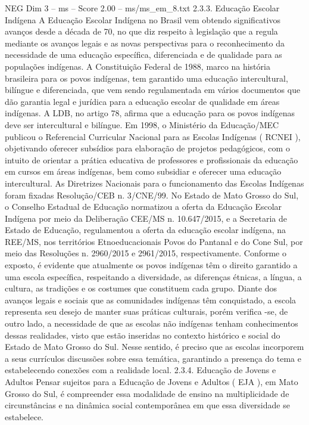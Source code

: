 \begin{textsample}{NEG Dim 3 – ms – Score 2.00 – ms/ms\_em\_8.txt}  \label{ex:f3_neg_099}
2.3.3.
Educação Escolar Indígena A Educação Escolar Indígena no Brasil vem obtendo significativos avanços desde a década de 70, no que diz respeito à legislação que a regula mediante os avanços legais e as novas perspectivas para o reconhecimento da necessidade de uma educação específica, diferenciada e de qualidade para as populações indígenas.
A Constituição Federal de 1988, marco na história brasileira para os povos indígenas, tem garantido uma educação intercultural, bilíngue e diferenciada, que vem sendo regulamentada em vários documentos que dão garantia legal e jurídica para a educação escolar de qualidade em áreas indígenas.
A LDB, no artigo 78, afirma que a educação para os povos indígenas deve ser intercultural e bilíngue.
Em 1998, o Ministério da Educação/MEC publicou o Referencial Curricular Nacional para as Escolas Indígenas ( RCNEI ), objetivando oferecer subsídios para elaboração de projetos pedagógicos, com o intuito de orientar a prática educativa de professores e profissionais da educação em cursos em áreas indígenas, bem como subsidiar e oferecer uma educação intercultural.
As Diretrizes Nacionais para o funcionamento das Escolas Indígenas foram fixadas Resolução/CEB n. 3/CNE/99.
No Estado de Mato Grosso do Sul, o Conselho Estadual de Educação normatizou a oferta da Educação Escolar Indígena por meio da Deliberação CEE/MS n. 10.647/2015, e a Secretaria de Estado de Educação, regulamentou a oferta da educação escolar indígena, na REE/MS, nos territórios Etnoeducacionais Povos do Pantanal e do Cone Sul, por meio das Resoluções n. 2960/2015 e 2961/2015, respectivamente.
Conforme o exposto, é evidente que atualmente os povos indígenas têm o direito garantido a uma escola específica, respeitando a diversidade, as diferenças étnicas, a língua, a cultura, as tradições e os costumes que constituem cada grupo.
Diante dos avanços legais e sociais que as comunidades indígenas têm conquistado, a escola representa seu desejo de manter suas práticas culturais, porém verifica -se, de outro lado, a necessidade de que as escolas não indígenas tenham conhecimentos dessas realidades, visto que estão inseridas no contexto histórico e social do Estado de Mato Grosso do Sul.
Nesse sentido, é preciso que as escolas incorporem a seus currículos discussões sobre essa temática, garantindo a presença do tema e estabelecendo conexões com a realidade local. 2.3.4.
Educação de Jovens e Adultos Pensar sujeitos para a Educação de Jovens e Adultos ( EJA ), em Mato Grosso do Sul, é compreender essa modalidade de ensino na multiplicidade de circunstâncias e na dinâmica social contemporânea em que essa diversidade se estabelece.

\end{textsample}
